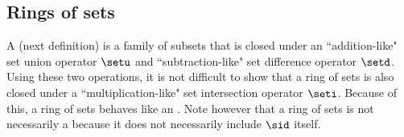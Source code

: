 





\subsection{Rings of sets}
A  (next definition) is a family of subsets
that is closed under an ``addition-like" set union operator $\setu$
and ``subtraction-like" set difference operator $\setd$.
Using these two operations, it is not difficult to show that
a ring of sets is also closed under a
``multiplication-like" set intersection operator $\seti$.
Because of this, a ring of sets behaves like an .
Note however that a ring of sets is not necessarily a   
because it does not necessarily include $\sid$ itself.

